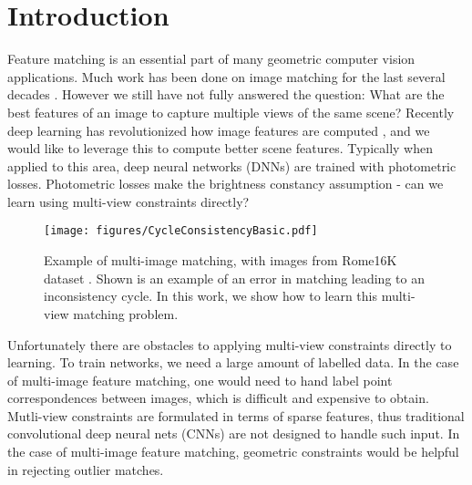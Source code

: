 \documentclass[10pt,twocolumn,letterpaper]{article}
\begin{document}
\section{Introduction}

Feature matching is an essential part of many geometric computer vision applications.
Much work has been done on image matching for the last several decades \cite{fischler1981random}.
However we still have not fully answered the question: What are the best features of an image to capture multiple views of the same scene?
Recently deep learning has revolutionized how image features are computed \cite{yi2016lift}, and we would like to leverage this to compute better scene features.
Typically when applied to this area, deep neural networks (DNNs) are trained with photometric losses.
Photometric losses make the brightness constancy assumption - can we learn using multi-view constraints directly?

\begin{figure}[t]
\begin{center}
  \texttt{[image: figures/CycleConsistencyBasic.pdf]}
\end{center}
  \caption{
    Example of multi-image matching, with images from Rome16K dataset \cite{li2010location}.
    Shown is an example of an error in matching leading to an inconsistency cycle.
    In this work, we show how to learn this multi-view matching problem.
  }
\label{fig:cycconsistex}
\label{fig:onecol}
\end{figure}


Unfortunately there are obstacles to applying multi-view constraints directly to learning. 
To train networks, we need a large amount of labelled data.
In the case of multi-image feature matching, one would need to hand label point correspondences between images, which is difficult and expensive to obtain.
Mutli-view constraints are formulated in terms of sparse features, thus traditional convolutional deep neural nets (CNNs) are not designed to handle such input.
In the case of multi-image feature matching, geometric constraints would be helpful in rejecting outlier matches.
\end{document}
